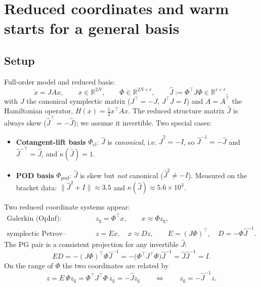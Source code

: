 
\section{Reduced coordinates and warm starts for a general basis}

\subsection{Setup}

Full-order model and reduced basis:
\begin{equation}
  \dot{x} = J A x, \qquad x \in \mathbb{R}^{2N}, \qquad
  \Phi \in \mathbb{R}^{2N \times r}, \qquad
  \hat{J} := \Phi^{\top} J \Phi \in \mathbb{R}^{r \times r},
\end{equation}
with $J$ the canonical symplectic matrix ($J^{\top} = -J$, $J^{\top}J = I$) and
$A = A^{\top}$ the Hamiltonian operator, $H(x) = \tfrac12 x^{\top} A x$.
The reduced structure matrix $\hat{J}$ is always skew
($\hat{J}^{\top} = -\hat{J}$); we assume it invertible. Two special cases:
\begin{itemize}
  \item \textbf{Cotangent-lift basis} $\Phi_{\mathrm{cl}}$:
        $\hat{J}$ is \emph{canonical}, i.e.
        $\hat{J}^2 = -I$, so $\hat{J}^{-1} = -\hat{J}$ and
        $\hat{J}^{-\top} = \hat{J}$, and $\kappa(\hat J) = 1$.
  \item \textbf{POD basis} $\Phi_{\mathrm{pod}}$: $\hat{J}$ is skew but
        \emph{not} canonical ($\hat{J}^2 \neq -I$). Measured on the bracket
        data: $\|\hat J^2 + I\| \approx 3.5$ and
        $\kappa(\hat J) \approx 5.6 \times 10^{3}$.
\end{itemize}

Two reduced coordinate systems appear:
\begin{align}
  \text{Galerkin (OpInf):}\quad
    & z_{\mathrm{g}} = \Phi^{\top} x, \qquad x \approx \Phi z_{\mathrm{g}} ,\\
  \text{symplectic Petrov--Galerkin (NiTROM):}\quad
    & z = E x, \quad x \approx D z, \qquad
      E = (J\Phi)^{\top}, \quad D = -\Phi \hat{J}^{-1} .
\end{align}
The PG pair is a consistent projection for any invertible $\hat J$:
\begin{equation}
  E D = -(J\Phi)^{\top} \Phi \hat{J}^{-1}
      = -\bigl(\Phi^{\top} J^{\top} \Phi\bigr) \hat{J}^{-1}
      = \hat{J} \hat{J}^{-1} = I .
\end{equation}
On the range of $\Phi$ the two coordinates are related by
\begin{equation}
  z = E\, \Phi z_{\mathrm{g}} = \Phi^{\top} J^{\top} \Phi \, z_{\mathrm{g}}
    = -\hat{J} z_{\mathrm{g}}
  \qquad\Longleftrightarrow\qquad
  z_{\mathrm{g}} = -\hat{J}^{-1} z .
  \label{eq:cov}
\end{equation}

